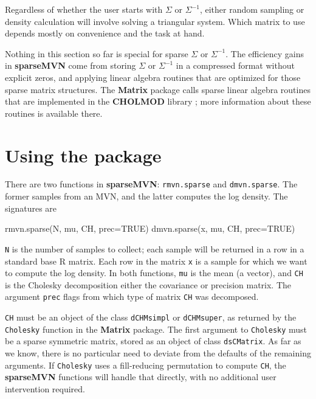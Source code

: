 \documentclass[11pt]{article}
\newcommand{\pkg}[1]{\textbf{#1}}
\newcommand{\proglang}[1]{\textsf{#1}}
\newcommand{\code}[1]{\texttt{#1}}
\newcommand{\func}[1]{\code{#1}}
\newcommand{\funcarg}[1]{\code{#1}}
\newcommand{\class}[1]{\texttt{#1}}
\begin{document}
Regardless of whether the user starts with $\Sigma$ or $\Sigma^{-1}$, either random sampling or density calculation will involve solving a triangular system. Which matrix to use depends mostly on convenience and the task at hand.

Nothing in this section so far is special for sparse $\Sigma$ or $\Sigma^{-1}$.  The efficiency gains in \pkg{sparseMVN} come from storing $\Sigma$ or $\Sigma^{-1}$ in a compressed format without explicit zeros, and applying linear algebra routines that are optimized for those sparse matrix structures.  The \pkg{Matrix} package calls sparse linear algebra routines that are implemented in the \pkg{CHOLMOD} library \citep{ChenDavis2008,DavisHager1999,DavisHager2009}; more information about these routines is available there.

\section{Using the package}

There are two functions in \pkg{sparseMVN}:  \func{rmvn.sparse} and \func{dmvn.sparse}.  The former samples from an MVN, and the latter computes the log density.  The signatures are

\begin{CodeInput}
rmvn.sparse(N, mu, CH, prec=TRUE)
dmvn.sparse(x, mu, CH, prec=TRUE)
\end{CodeInput}

\funcarg{N} is the number of samples to collect; each sample will be returned in a row in a standard base \proglang{R} matrix. Each row in the matrix \funcarg{x} is a sample for which we want to compute the log density.  In both functions, \funcarg{mu} is the mean (a vector), and \funcarg{CH} is the Cholesky decomposition either the covariance or precision matrix.  The argument \funcarg{prec} flags from which type of matrix \funcarg{CH} was decomposed.

\funcarg{CH} must be an object of the class \class{dCHMsimpl} or \class{dCHMsuper}, as returned by the \func{Cholesky} function in the \pkg{Matrix} package.  The first argument to \func{Cholesky} must be a sparse symmetric matrix, stored as an object of class \class{dsCMatrix}.  As far as we know, there is no particular need to deviate from the defaults of the remaining arguments.  If \func{Cholesky} uses a fill-reducing permutation to compute \funcarg{CH}, the \pkg{sparseMVN} functions will handle that directly, with no additional user intervention required.
\end{document}
